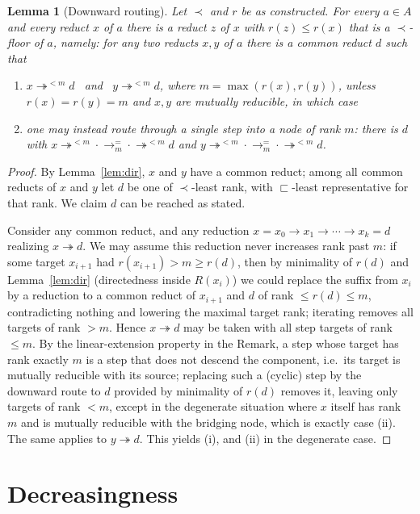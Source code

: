\documentclass{amsart}
\newtheorem{lemma}{Lemma}
\theoremstyle{definition}
\theoremstyle{remark}
\newcommand{\redto}{\rightarrow}
\newcommand{\redtt}{\twoheadrightarrow}
\begin{document}
\begin{lemma}[Downward routing]\label{lem:descend}
Let $\prec$ and $r$ be as constructed.  For every $a\in A$ and every reduct
$x$ of $a$ there is a reduct $z$ of $x$ with $r(z)\le r(x)$ that is a
\emph{$\prec$-floor} of $a$, namely: for any two reducts $x,y$ of $a$ there is a
common reduct $d$ such that
\begin{enumerate}
\item[(i)] $x\redtt^{<m} d$ \ and \ $y\redtt^{<m} d$, \quad where $m=\max(r(x),r(y))$,
unless $r(x)=r(y)=m$ and $x,y$ are mutually reducible, in which case
\item[(ii)] one may instead route through a single step into a node of rank
$m$: there is $d$ with $x\redtt^{<m}\!\cdot\redto^{=}_{m}\!\cdot\redtt^{<m} d$
and $y\redtt^{<m}\!\cdot\redto^{=}_{m}\!\cdot\redtt^{<m} d$.
\end{enumerate}
\end{lemma}

\begin{proof}
By Lemma~\ref{lem:dir}, $x$ and $y$ have a common reduct; among all common
reducts of $x$ and $y$ let $d$ be one of $\prec$-least rank, with
$\sqsubset$-least representative for that rank.  We claim $d$ can be reached as
stated.

Consider any common reduct, and any reduction $x=x_0\redto x_1\redto\cdots\redto
x_k=d$ realizing $x\redtt d$.  We may assume this reduction never increases
rank past $m$: if some target $x_{i+1}$ had $r(x_{i+1})>m\ge r(d)$, then by
minimality of $r(d)$ and Lemma~\ref{lem:dir} (directedness inside $R(x_i)$) we
could replace the suffix from $x_i$ by a reduction to a common reduct of
$x_{i+1}$ and $d$ of rank $\le r(d)\le m$, contradicting nothing and lowering
the maximal target rank; iterating removes all targets of rank $>m$.  Hence
$x\redtt d$ may be taken with all step targets of rank $\le m$.  By the linear-extension
property in the Remark, a step whose target has rank exactly $m$ is a step that
does not descend the component, i.e.\ its target is mutually reducible with its
source; replacing such a (cyclic) step by the downward route to $d$ provided by
minimality of $r(d)$ removes it, leaving only targets of rank $<m$, except in
the degenerate situation where $x$ itself has rank $m$ and is mutually reducible
with the bridging node, which is exactly case (ii).  The same applies to
$y\redtt d$.  This yields (i), and (ii) in the degenerate case.
\end{proof}

\section{Decreasingness}
\end{document}
